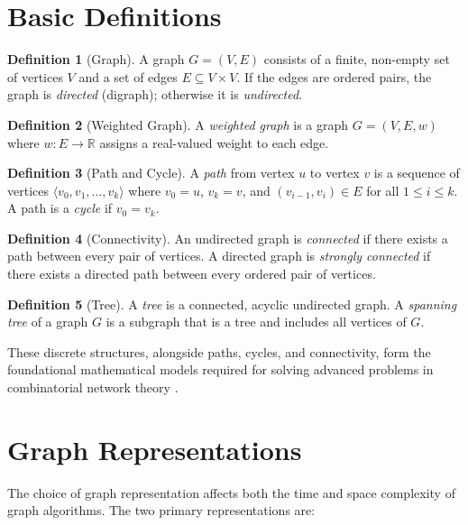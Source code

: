 \documentclass[12pt, a4paper, oneside]{report}
\theoremstyle{definition}
\newtheorem{definition}{Definition}[chapter]
\begin{document}
\section{Basic Definitions}

\begin{definition}[Graph]
A graph $G = (V, E)$ consists of a finite, non-empty set of vertices $V$ and a set of edges $E \subseteq V \times V$. If the edges are ordered pairs, the graph is \emph{directed} (digraph); otherwise it is \emph{undirected}.
\end{definition}

\begin{definition}[Weighted Graph]
A \emph{weighted graph} is a graph $G = (V, E, w)$ where $w: E \to \mathbb{R}$ assigns a real-valued weight to each edge.
\end{definition}

\begin{definition}[Path and Cycle]
A \emph{path} from vertex $u$ to vertex $v$ is a sequence of vertices $\langle v_0, v_1, \ldots, v_k \rangle$ where $v_0 = u$, $v_k = v$, and $(v_{i-1}, v_i) \in E$ for all $1 \leq i \leq k$. A path is a \emph{cycle} if $v_0 = v_k$.
\end{definition}

\begin{definition}[Connectivity]
An undirected graph is \emph{connected} if there exists a path between every pair of vertices. A directed graph is \emph{strongly connected} if there exists a directed path between every ordered pair of vertices.
\end{definition}

\begin{definition}[Tree]
A \emph{tree} is a connected, acyclic undirected graph. A \emph{spanning tree} of a graph $G$ is a subgraph that is a tree and includes all vertices of $G$.
\end{definition}

These discrete structures, alongside paths, cycles, and connectivity, form the foundational mathematical models required for solving advanced problems in combinatorial network theory \citep{korte2018}.

\section{Graph Representations}

The choice of graph representation affects both the time and space complexity of graph algorithms. The two primary representations are:
\end{document}
